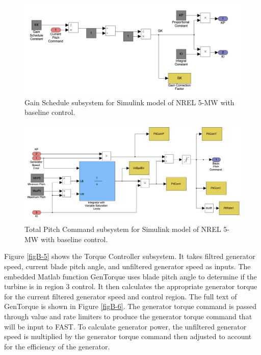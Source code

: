  \begin{figure}[ht]
	\centering
		\includegraphics[width=\linewidth]{Figures/AppendixBFigures/baseline3.png}
	\caption{Gain Schedule subsystem for Simulink model of NREL 5-MW with baseline control.}
	\label{figB-3}
\end{figure}

 \begin{figure}[ht]
	\centering
		\includegraphics[width=\linewidth]{Figures/AppendixBFigures/baseline4.png}
	\caption{Total Pitch Command subsystem for Simulink model of NREL 5-MW with baseline control.}
	\label{figB-4}
\end{figure}

Figure \ref{figB-5} shows the Torque Controller subsystem.  It takes filtred generator speed, current blade pitch angle, and unfiltered generator speed as inputs. The embedded Matlab function GenTorque uses blade pitch angle to determine if the turbine is in region 3 control. It then calculates the appropriate generator torque for the current filtered generator speed and control region. The full text of GenTorque is shown in Figure \ref{figB-6}. The generator torque command is passed through value and rate limiters to produce the generator torque command that will be input to FAST. To calculate generator power, the unfiltered generator speed is multiplied by the generator torque command then adjusted to account for the efficiency of the generator.

